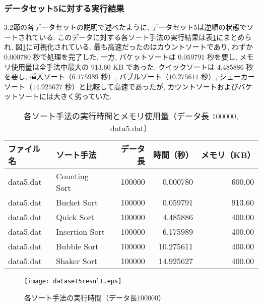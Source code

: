 \documentclass[a4j, 11pt]{jarticle}
\begin{document}
\subsubsection{データセット5に対する実行結果}
3.2節の各データセットの説明で述べたように, データセット5は逆順の状態でソートされている. このデータに対する各ソート手法の実行結果は表\ref{dataset5allresult}にまとめられ, 図\ref{dataset5allresultgraph}に可視化されている. 最も高速だったのはカウントソートであり, わずか $0.000780$ 秒で処理を完了した. 一方, バケットソートは $0.059791$ 秒を要し, メモリ使用量は全手法中最大の $913.60$ KB であった. クイックソートは $4.485886$ 秒を要し, 挿入ソート（$6.175989$ 秒）, バブルソート（$10.275611$ 秒）, シェーカーソート（$14.925627$ 秒）と比較して高速であったが, カウントソートおよびバケットソートには大きく劣っていた. 
\begin{table}[H]
  \centering
  \caption{各ソート手法の実行時間とメモリ使用量（データ長 100000, data5.dat）}\label{dataset5allresult}
  \begin{tabular}{|l|l|r|r|r|}
    \hline
    \textbf{ファイル名} & \textbf{ソート手法} & \textbf{データ長} & \textbf{時間（秒）} & \textbf{メモリ（KB）} \\
    \hline
    data5.dat & Counting Sort  & 100000 & 0.000780  & 600.00 \\
    data5.dat & Bucket Sort    & 100000 & 0.059791  & 913.60 \\
    data5.dat & Quick Sort     & 100000 & 4.485886  & 400.00 \\
    data5.dat & Insertion Sort & 100000 & 6.175989  & 400.00 \\
    data5.dat & Bubble Sort    & 100000 & 10.275611 & 400.00 \\
    data5.dat & Shaker Sort    & 100000 & 14.925627 & 400.00 \\
    \hline
  \end{tabular}
\end{table}
\begin{figure}[H]
  \centering
  \texttt{[image: dataset5result.eps]}
  \caption{各ソート手法の実行時間（データ長100000）}\label{dataset5allresultgraph}
\end{figure}
\end{document}
